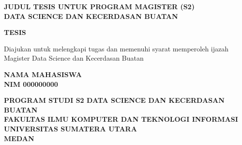 \clearpage
\thispagestyle{empty}
\begin{center}
\vspace*{60mm minus 10mm}

{\fontsize{14}{18}\selectfont\bfseries JUDUL TESIS UNTUK PROGRAM MAGISTER (S2)\\
DATA SCIENCE DAN KECERDASAN BUATAN\par}

\vspace{14mm}

{\fontsize{14}{18}\selectfont\bfseries TESIS\par}

\vspace{6mm}

{\fontsize{12}{16}\selectfont
Diajukan untuk melengkapi tugas dan memenuhi syarat memperoleh ijazah\\
Magister Data Science dan Kecerdasan Buatan\par}

\vspace{14mm}

{\fontsize{14}{18}\selectfont\bfseries NAMA MAHASISWA\\
NIM 000000000\par}

\vfill

\ThesisLogo

\vfill

{\fontsize{14}{18}\selectfont\bfseries
PROGRAM STUDI S2 DATA SCIENCE DAN KECERDASAN BUATAN\\
FAKULTAS ILMU KOMPUTER DAN TEKNOLOGI INFORMASI\\
UNIVERSITAS SUMATERA UTARA\\
MEDAN\\
\the\year\par}

\vspace*{60mm minus 10mm}
\end{center}
\restoregeometry
\clearpage
